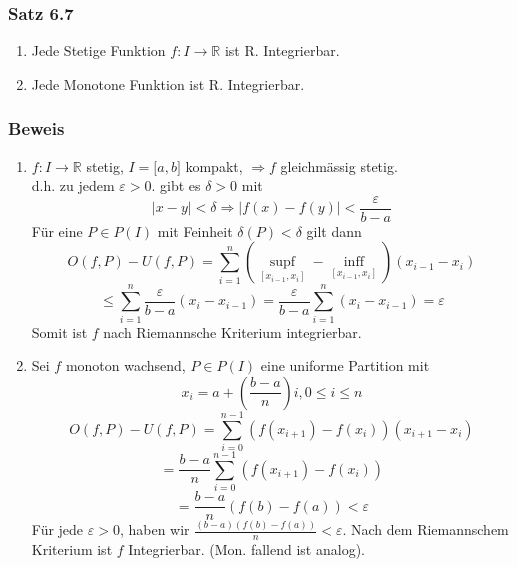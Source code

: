 \subsubsection*{Satz 6.7}
\begin{enumerate}
\item Jede Stetige Funktion $f:I\rightarrow \mathbb{R}$ ist R. Integrierbar.
\item Jede Monotone Funktion ist R. Integrierbar.
\end{enumerate}
\subsubsection*{Beweis}
\begin{enumerate}
\item $f:I\rightarrow\mathbb{R}$ stetig, $I=\lbrack a,b\rbrack$ kompakt, $\Rightarrow f$ gleichmässig stetig.\\
d.h. zu jedem $\varepsilon >0$. gibt es $\delta >0$ mit $$\left| {x - y} \right| < \delta  \Rightarrow \left| {f(x) - f(y)} \right| < \frac{\varepsilon }{{b - a}}$$
Für eine $P\in P(I)$ mit Feinheit $\delta(P)<\delta$ gilt dann $$O(f,P)-U(f,P)=\sum\limits_{i = 1}^n {(\mathop {\sup f}\limits_{[{x_{i - 1}},{x_i}]}  - \mathop {\inf f}\limits_{[{x_{i - 1}},{x_i}]} )} ({x_{i - 1}} - {x_i}) $$$$\le \sum\limits_{i = 1}^n {\frac{\varepsilon }{{b - a}}({x_i} - {x_{i - 1}}) = \frac{\varepsilon }{{b - a}}\sum\limits_{i = 1}^n {({x_i} - {x_{i - 1}})} }  = \varepsilon $$
Somit ist $f$ nach Riemannsche Kriterium integrierbar.

\item Sei $f$ monoton wachsend, $P\in P(I)$ eine uniforme Partition mit $$x_i = a+\left(\frac{b-a}{n}\right)i, 0\leq i \leq n$$
$$O(f,P) - U(f,P) = \sum\limits_{i = 0}^{n - 1} {(f({x_{i + 1}}) - f({x_i}))({x_{i + 1}} - {x_i})} $$$$ = \frac{{b - a}}{n}\sum\limits_{i = 0}^{n - 1} {(f({x_{i + 1}}) - f({x_i}))} $$ $$ = \frac{{b - a}}{n}(f(b) - f(a)) < \varepsilon $$
Für jede $\varepsilon>0$, haben wir $\frac{{(b - a)(f(b) - f(a))}}{n} < \varepsilon$. Nach dem Riemannschem Kriterium ist $f$ Integrierbar. (Mon. fallend ist analog). 
\end{enumerate}

